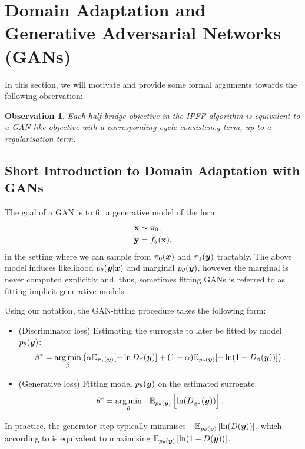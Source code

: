 \documentclass[a4paper,12pt,twoside,openright]{report}
\newtheorem{observation}{Observation}
\theoremstyle{definition}
\begin{document}
\section{Domain Adaptation and Generative Adversarial Networks (GANs)}

In this section, we will motivate and provide some formal arguments towards the following observation:
\begin{observation}
Each half-bridge objective in the IPFP algorithm is equivalent to a GAN-like objective with a corresponding cycle-consistency term, up to a regularisation term.
\end{observation}

\subsection{Short Introduction to Domain Adaptation with GANs}

The goal of a GAN \citep{goodfellow2014generative} is to fit a generative model of the form
\begin{align*}
    {\mathbf{x}} &\sim \pi_0, \\
    {\mathbf{y}} &= f_{\theta}({\mathbf{x}}),
\end{align*}
in the setting where we can sample from $\pi_0({\bm{x}})$ and $\pi_1({\bm{y}})$ tractably. The above model induces likelihood $p_{\theta}({\bm{y}} | {\bm{x}})$ and marginal $p_{\theta}({\bm{y}})$, however the marginal is never computed explicitly and, thus, sometimes fitting GANs is referred to as fitting implicit generative models \citep{mohamed2016learning}.

Using our notation, the GAN-fitting procedure \citep{goodfellow2014generative} takes the following form:

\begin{itemize}
    \item (Discriminator loss) Estimating the surrogate to later be fitted by model $p_{\theta}({\bm{y}})$:
 $$ {\beta}^{*} = \operatorname*{arg\,min}_{\beta} \left(\alpha \mathbb{E}_{\pi_1({\bm{y}})}[-\operatorname{ln} D_{\beta}({\bm{y}})] + (1-\alpha)\mathbb{E}_{p_{\theta}({\bm{y}})}[-\operatorname{ln} (1-D_{\beta}({\bm{y}}))]\right).$$ 
 \item (Generative loss) Fitting model $p_{\theta}({\bm{y}})$ on the estimated surrogate:
 $$\theta^{*} = \operatorname*{arg\,min}_{\theta}-\mathbb{E}_{p_{\theta}({\bm{y}})}\left[\operatorname{ln}(D_{\hat{\beta^{*}}}({\bm{y}}))\right].$$ 
\end{itemize}

In practice, the generator step \citep{goodfellow2014generative} typically minimises $-\mathbb{E}_{p_{\theta}({\bm{y}})}\left[\operatorname{ln}(D({\bm{y}}))\right]$, which according to \cite{goodfellow2014generative} is equivalent to maximising  $\mathbb{E}_{p_{\theta}({\bm{y}})}\left[\operatorname{ln}(1-D({\bm{y}}))\right]$.
\end{document}
